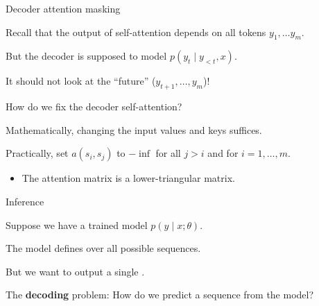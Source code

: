 \documentclass[usenames,dvipsnames,notes,11pt,aspectratio=169,hyperref={colorlinks=true, linkcolor=blue}]{beamer}
\begin{document}
\begin{frame}
    {Decoder attention masking}

    Recall that the output of self-attention depends on all tokens $y_1,\ldots y_m$.

    But the decoder is supposed to model $p(y_t\mid y_{<t}, x)$.

    It should not look at the ``future'' ($y_{t+1},\ldots,y_m$)!

    \pause
    How do we fix the decoder self-attention?\\
    \begin{wideitemize}
        \item Mathematically, changing the input values and keys suffices.
        \item Practically, set $a(s_i, s_j)$ to $-\inf$ for all $j>i$ and for $i=1,\ldots,m$.
            \begin{itemize}
                \item The attention matrix is a lower-triangular matrix.
            \end{itemize}
    \end{wideitemize}
\end{frame}


\begin{frame}
    {Inference}

    Suppose we have a trained model $p(y\mid x;\theta)$.

    The model defines  over all possible sequences.

    But we want to output a single .

    The \textbf{decoding} problem: How do we predict a sequence from the model?
\end{frame}
\end{document}
